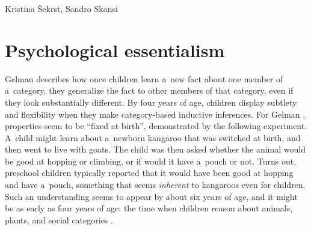\begin{artengenv2auth}{Kristina Šekrst, Sandro Skansi}
\section*{Psychological essentialism}
Gelman
\parencite*[][p.405]{gelman_psychological_2004} %
 describes how once children learn a~new fact about one member of a~category, they generalize the fact to other members of that category, even if they look substantially different. By four years of age, children display subtlety and flexibility when they make category-based inductive inferences. For Gelman 
\parencite*[][p.405]{gelman_psychological_2004}, %
 properties seem to be ``fixed at birth'', demonstrated by the following experiment. A~child might learn about a~newborn kangaroo that was switched at birth, and then went to live with goats. The child was then asked whether the animal would be good at hopping or climbing, or if would it have a~pouch or not. Turns out, preschool children typically reported that it would have been good at hopping and have a~pouch, something that seems \textit{inherent} to kangaroos even for children. Such an understanding seems to appear by about six years of age, and it might be as early as four years of age: the time when children reason about animals, plants, and social categories 
\parencite[][p.406]{gelman_psychological_2004}.%



\end{artengenv2auth}
